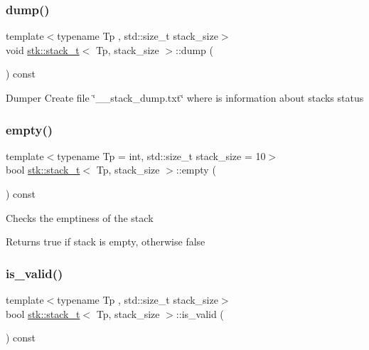 \subsubsection{\texorpdfstring{dump()}{dump()}}
{\footnotesize\ttfamily template$<$typename Tp , std\+::size\+\_\+t stack\+\_\+size$>$ \\
void \hyperlink{classstk_1_1stack__t}{stk\+::stack\+\_\+t}$<$ Tp, stack\+\_\+size $>$\+::dump (\begin{DoxyParamCaption}{ }\end{DoxyParamCaption}) const\hspace{0.3cm}{\ttfamily [private]}}

Dumper Create file \char`\"{}\+\_\+\+\_\+stack\+\_\+dump.\+txt\char`\"{} where is information about stack\textquotesingle{}s status \mbox{\label{classstk_1_1stack__t_adb144d5de96aeeed6dee8d902158f1a6}} 
\subsubsection{\texorpdfstring{empty()}{empty()}}
{\footnotesize\ttfamily template$<$typename Tp  = int, std\+::size\+\_\+t stack\+\_\+size = 10$>$ \\
bool \hyperlink{classstk_1_1stack__t}{stk\+::stack\+\_\+t}$<$ Tp, stack\+\_\+size $>$\+::empty (\begin{DoxyParamCaption}{ }\end{DoxyParamCaption}) const\hspace{0.3cm}{\ttfamily [inline]}}

Checks the emptiness of the stack \begin{DoxyReturn}{Returns}
true if stack is empty, otherwise false 
\end{DoxyReturn}
\mbox{\label{classstk_1_1stack__t_a6c1813c8dc347f0cc9ab94a6e120d743}} 
\subsubsection{\texorpdfstring{is\+\_\+valid()}{is\_valid()}}
{\footnotesize\ttfamily template$<$typename Tp , std\+::size\+\_\+t stack\+\_\+size$>$ \\
bool \hyperlink{classstk_1_1stack__t}{stk\+::stack\+\_\+t}$<$ Tp, stack\+\_\+size $>$\+::is\+\_\+valid (\begin{DoxyParamCaption}{ }\end{DoxyParamCaption}) const\hspace{0.3cm}{\ttfamily [private]}}

